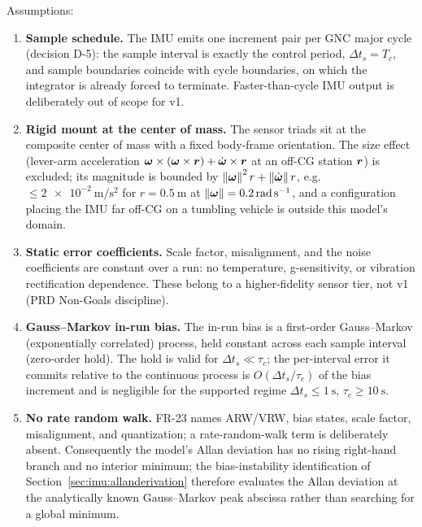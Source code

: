 Assumptions:
\begin{enumerate}
  \item \textbf{Sample schedule.} The IMU emits one increment pair per GNC
    major cycle (decision D-5): the sample interval is exactly the control
    period, $\Delta t_s = T_c$, and sample boundaries coincide with cycle
    boundaries, on which the integrator is already forced to terminate.
    Faster-than-cycle IMU output is deliberately out of scope for v1.
  \item \textbf{Rigid mount at the center of mass.} The sensor triads sit
    at the composite center of mass with a fixed body-frame orientation.
    The size effect (lever-arm acceleration
    $\bm{\omega}\times(\bm{\omega}\times\bm{r})
    + \dot{\bm{\omega}}\times\bm{r}$ at an off-CG station $\bm{r}$) is
    excluded; its magnitude is bounded by
    $\left\lVert \bm{\omega} \right\rVert^2 r + \left\lVert \dot{\bm{\omega}} \right\rVert r$, e.g.\
    $\le \qty{2e-2}{\metre\per\second\squared}$ for
    $r = \qty{0.5}{\metre}$ at $\left\lVert \bm{\omega} \right\rVert =
    \qty{0.2}{\radian\per\second}$, and a configuration placing the IMU
    far off-CG on a tumbling vehicle is outside this model's domain.
  \item \textbf{Static error coefficients.} Scale factor, misalignment,
    and the noise coefficients are constant over a run: no temperature,
    g-sensitivity, or vibration rectification dependence. These belong to
    a higher-fidelity sensor tier, not v1 (PRD Non-Goals discipline).
  \item \textbf{Gauss--Markov in-run bias.} The in-run bias is a
    first-order Gauss--Markov (exponentially correlated) process, held
    constant across each sample interval (zero-order hold). The hold is
    valid for $\Delta t_s \ll \tau_c$; the per-interval error it commits
    relative to the continuous process is $O(\Delta t_s/\tau_c)$ of the
    bias increment and is negligible for the supported regime
    $\Delta t_s \le \qty{1}{\second}$, $\tau_c \ge \qty{10}{\second}$.
  \item \textbf{No rate random walk.} FR-23 names ARW/VRW, bias states,
    scale factor, misalignment, and quantization; a rate-random-walk term
    is deliberately absent. Consequently the model's Allan deviation has
    no rising right-hand branch and no interior minimum; the
    bias-instability identification of
    Section~\ref{sec:imu:allanderivation} therefore evaluates the Allan
    deviation at the analytically known Gauss--Markov peak abscissa
    rather than searching for a global minimum.
\end{enumerate}

